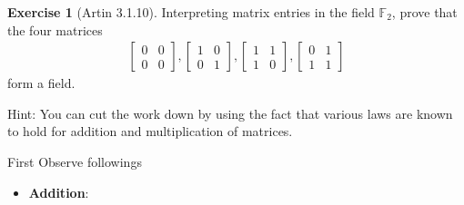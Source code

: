 \documentclass[
]{book}
\providecommand{\tightlist}{%
  \setlength{\itemsep}{0pt}\setlength{\parskip}{0pt}}
\theoremstyle{definition}
\theoremstyle{definition}
\theoremstyle{definition}
\newtheorem{exercise}{Exercise}[chapter]
\theoremstyle{definition}
\theoremstyle{remark}
\begin{document}
\begin{exercise}[Artin 3.1.10]
\protect\hypertarget{exr:unnamed-chunk-277}{}\label{exr:unnamed-chunk-277}Interpreting matrix entries in the field \(\mathbb{F}_2\), prove that the four matrices
\begin{align*}
\begin{bmatrix} 0 & 0 \\ 0 & 0 \end{bmatrix}, 
\begin{bmatrix} 1 & 0 \\ 0 & 1 \end{bmatrix}, 
\begin{bmatrix} 1 & 1 \\ 1 & 0 \end{bmatrix}, 
\begin{bmatrix} 0 & 1 \\ 1 & 1 \end{bmatrix}
\end{align*}
form a field.

Hint: You can cut the work down by using the fact that various laws are known to hold for addition and multiplication of matrices.
\end{exercise}

First Observe followings

\begin{itemize}
\tightlist
\item
  \textbf{Addition}:
\end{itemize}
\end{document}
